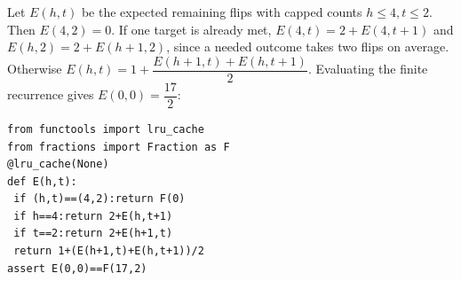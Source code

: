 Let $ E(h,t)$ be the expected remaining flips with capped counts $ h\le4,t\le2 $. Then $ E(4,2)=0 $. If one target is already met, $ E(4,t)=2+E(4,t+1)$ and $ E(h,2)=2+E(h+1,2)$, since a needed outcome takes two flips on average. Otherwise $ E(h,t)=1+\dfrac{E(h+1,t)+E(h,t+1)}{2}$. Evaluating the finite recurrence gives $ E(0,0)=\boxed{\dfrac{17}{2}}$:
\begin{verbatim}
from functools import lru_cache
from fractions import Fraction as F
@lru_cache(None)
def E(h,t):
 if (h,t)==(4,2):return F(0)
 if h==4:return 2+E(h,t+1)
 if t==2:return 2+E(h+1,t)
 return 1+(E(h+1,t)+E(h,t+1))/2
assert E(0,0)==F(17,2)
\end{verbatim}
